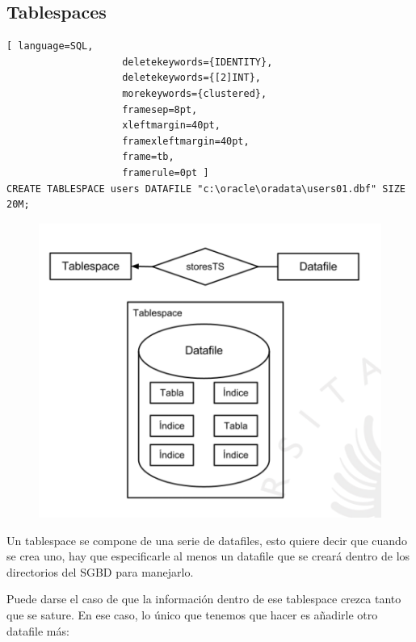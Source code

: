 \subsection{Tablespaces}
\begin{lstlisting}[ language=SQL,
                    deletekeywords={IDENTITY},
                    deletekeywords={[2]INT},
                    morekeywords={clustered},
                    framesep=8pt,
                    xleftmargin=40pt,
                    framexleftmargin=40pt,
                    frame=tb,
                    framerule=0pt ]
CREATE TABLESPACE users DATAFILE "c:\oracle\oradata\users01.dbf" SIZE 20M;
\end{lstlisting}
\begin{figure}[H]
  \center
  \includegraphics[scale=0.4]{img/10.png}
\end{figure}

Un tablespace se compone de una serie de datafiles, esto quiere decir que cuando se crea uno, hay que especificarle al menos un datafile que se creará dentro de los directorios del SGBD para manejarlo.

Puede darse el caso de que la información dentro de ese tablespace crezca tanto que se sature. En ese caso, lo único que tenemos que hacer es añadirle otro datafile más:

